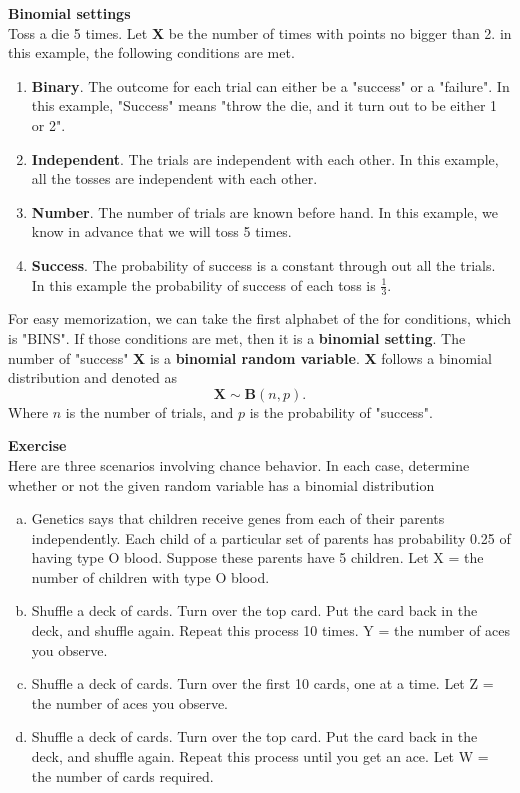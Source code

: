 \documentclass[a4paper, 12pt,twoside]{book}
\begin{document}
\textbf{Binomial settings}\vspace{0.6cm}\\
Toss a die 5 times. Let \textbf{X} be the number of times with points no bigger than 2. in this example, the following conditions are met.
    \begin{enumerate}[(1)]
        \item \textbf{Binary}. The outcome for each trial can either be a "success" or a "failure". 
        In this example, "Success" means "throw the die, and it turn out to be either 1 or 2".
        \item \textbf{Independent}. The trials are independent with each other. 
        In this example, all the tosses are independent with each other.
        \item \textbf{Number}. The number of trials are known before hand.
        In this example, we know in advance that we will toss 5 times.
        \item \textbf{Success}. The probability of success is a constant through out all the trials.
        In this example the probability of success of each toss is $\frac{1}{3}$.
    \end{enumerate}   
  For easy memorization, we can take the first alphabet of the for conditions, which is "BINS". If those conditions are met, then  it is a \textbf{binomial setting}. The number of "success" \textbf{X} is a \textbf{binomial random variable}. \textbf{X} follows a binomial distribution and denoted as
      $$\textbf{X} \sim \textbf{B}(n, p).$$    
      Where $n$ is the number of trials, and $p$ is the probability of "success".\vspace{0.6cm}\\
      \hspace{-0.5cm}
      \colorbox{champagne}{\parbox{\textwidth}{
      \textbf{Exercise}\vspace{0.3cm}\\
       Here are three scenarios involving chance behavior. In each case, determine whether or not the given random variable has a binomial distribution
       \begin{enumerate}[(a)]
           \item Genetics says that children receive genes from each of their parents independently. Each child of a particular set of parents has probability 0.25 of having type O blood. Suppose these parents have 5 children. Let X = the number of children with type O blood.
            \item Shuffle a deck of cards. Turn over the top card. Put the card back in the deck, and shuffle again. Repeat this process 10 times. Y = the number of aces you observe. 
           \item Shuffle a deck of cards. Turn over the first 10 cards, one at a time. Let Z = the number of aces you observe. 
           \item Shuffle a deck of cards. Turn over the top card. Put the card back in the deck, and shuffle again. Repeat this process until you get an ace. Let W = the number of cards required.
       \end{enumerate}
      }}
      \newpage
      
\end{document}
